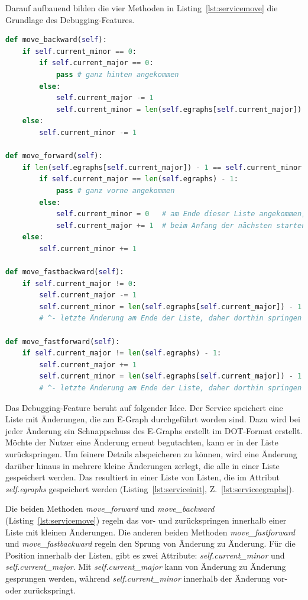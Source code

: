 Darauf aufbauend bilden die vier Methoden in Listing~\ref{lst:servicemove} die Grundlage des Debugging-Features.

\begin{lstlisting}[language=Python, escapechar=|, caption=Methoden für das Debugging aus der Datei \textit{EGraphService.py}, label={lst:servicemove}]
def move_backward(self):
    if self.current_minor == 0:
        if self.current_major == 0:
            pass # ganz hinten angekommen
        else:
            self.current_major -= 1
            self.current_minor = len(self.egraphs[self.current_major]) - 1
    else:
        self.current_minor -= 1

def move_forward(self):
    if len(self.egraphs[self.current_major]) - 1 == self.current_minor:
        if self.current_major == len(self.egraphs) - 1:
            pass # ganz vorne angekommen
        else:
            self.current_minor = 0   # am Ende dieser Liste angekommen,
            self.current_major += 1  # beim Anfang der nächsten starten
    else:
        self.current_minor += 1

def move_fastbackward(self):
    if self.current_major != 0:
        self.current_major -= 1
        self.current_minor = len(self.egraphs[self.current_major]) - 1
        # ^- letzte Änderung am Ende der Liste, daher dorthin springen

def move_fastforward(self):
    if self.current_major != len(self.egraphs) - 1:
        self.current_major += 1
        self.current_minor = len(self.egraphs[self.current_major]) - 1
        # ^- letzte Änderung am Ende der Liste, daher dorthin springen
\end{lstlisting} 

Das Debugging-Feature beruht auf folgender Idee. Der Service speichert eine Liste mit Änderungen, die am E-Graph durchgeführt worden sind.
Dazu wird bei jeder Änderung ein Schnappschuss des E-Graphs erstellt im DOT-Format erstellt.
Möchte der Nutzer eine Änderung erneut begutachten, kann er in der Liste zurückspringen. Um feinere Details abspeicheren zu können, wird 
eine Änderung darüber hinaus in mehrere kleine Änderungen zerlegt, die alle in einer Liste gespeichert werden. Das resultiert in einer Liste von Listen,
die im Attribut \textit{self.egraphs} gespeichert werden (Listing~\ref{lst:serviceinit}, Z.~\ref{lst:serviceegraphs}).

Die beiden Methoden \textit{move\_forward} und \textit{move\_backward} (Listing~\ref{lst:servicemove}) regeln das vor- und zurückspringen innerhalb einer Liste mit kleinen Änderungen.
Die anderen beiden Methoden \textit{move\_fastforward} und \textit{move\_fastbackward} regeln den Sprung von Änderung zu Änderung.
Für die Position innerhalb der Listen, gibt es zwei Attribute: \textit{self.current\_minor} und \textit{self.current\_major}. Mit \textit{self.current\_major} kann von Änderung
zu Änderung gesprungen werden, während \textit{self.current\_minor} innerhalb der Änderung vor- oder zurückspringt.

